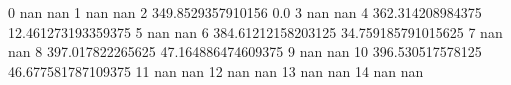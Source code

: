 0 nan nan
1 nan nan
2 349.8529357910156 0.0
3 nan nan
4 362.314208984375 12.461273193359375
5 nan nan
6 384.61212158203125 34.759185791015625
7 nan nan
8 397.017822265625 47.164886474609375
9 nan nan
10 396.530517578125 46.677581787109375
11 nan nan
12 nan nan
13 nan nan
14 nan nan
